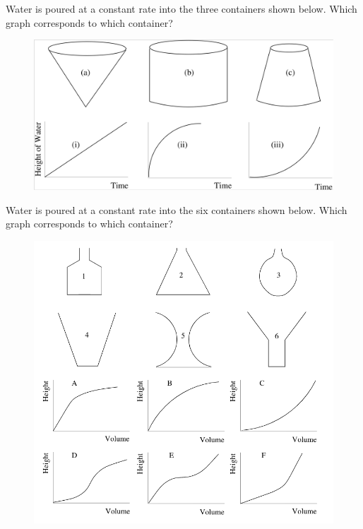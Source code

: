 \documentclass[nooutcomes]{ximera}
\begin{document}
\newpage


\begin{problem} \label{graphicDetails2}
Water is poured at a constant rate into the three containers shown
below. Which graph corresponds to which container?

\begin{figure}[h]
\begin{center}
\includegraphics[width=\textwidth]{GraphicDetails2.png}
\end{center}
\end{figure}


\end{problem}

\newpage

\begin{problem} \label{graphicDetails3}
Water is poured at a constant rate into the six containers shown
below. Which graph corresponds to which container?

\begin{figure}[h]
\begin{center}
\includegraphics[width=\textwidth]{GraphicDetails3.png}
\end{center}
\end{figure}


\end{problem}
\end{document}
